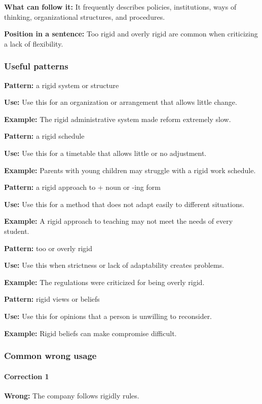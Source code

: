 \documentclass[11pt]{article}
\begin{document}
\textbf{What can follow it:} It frequently describes policies, institutions, ways of thinking, organizational structures, and procedures.

\textbf{Position in a sentence:} Too rigid and overly rigid are common when criticizing a lack of flexibility.

\subsubsection{Useful patterns}
\textbf{Pattern:} a rigid system or structure

\textbf{Use:} Use this for an organization or arrangement that allows little change.

\textbf{Example:} The rigid administrative system made reform extremely slow.

\textbf{Pattern:} a rigid schedule

\textbf{Use:} Use this for a timetable that allows little or no adjustment.

\textbf{Example:} Parents with young children may struggle with a rigid work schedule.

\textbf{Pattern:} a rigid approach to + noun or -ing form

\textbf{Use:} Use this for a method that does not adapt easily to different situations.

\textbf{Example:} A rigid approach to teaching may not meet the needs of every student.

\textbf{Pattern:} too or overly rigid

\textbf{Use:} Use this when strictness or lack of adaptability creates problems.

\textbf{Example:} The regulations were criticized for being overly rigid.

\textbf{Pattern:} rigid views or beliefs

\textbf{Use:} Use this for opinions that a person is unwilling to reconsider.

\textbf{Example:} Rigid beliefs can make compromise difficult.

\subsubsection{Common wrong usage}
\paragraph{Correction 1}
\textbf{Wrong:} The company follows rigidly rules.
\end{document}
